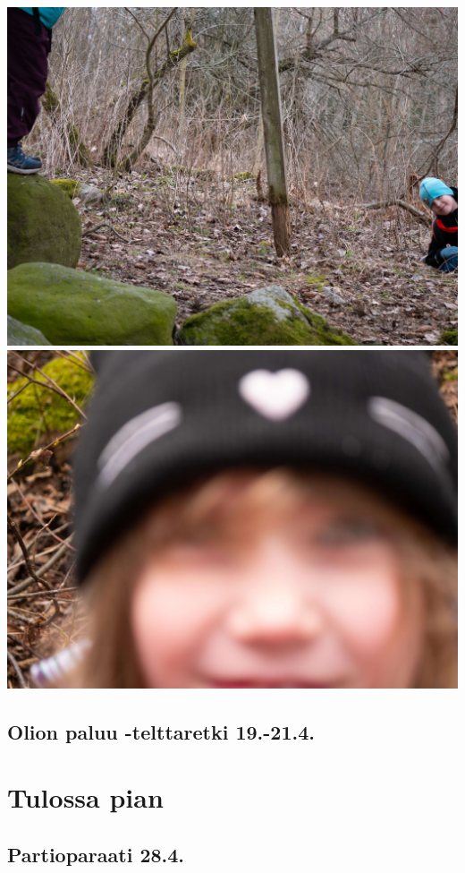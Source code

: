 \documentclass[10pt,finnish,a5paper,headings=small,twoside=semi]{scrartcl}
\begin{document}
\begin{multicols}{2}
	\noindent\includegraphics[width=0.9\linewidth]{assets/kolkkienpäiväretki11}
	\noindent\includegraphics[width=0.9\linewidth]{assets/kolkkienpäiväretki12}


\end{multicols}

\subsection{Olion paluu -telttaretki 19.-21.4.}

\clearpage\section{Tulossa pian}
\subsection{Partioparaati 28.4.}
\end{document}
